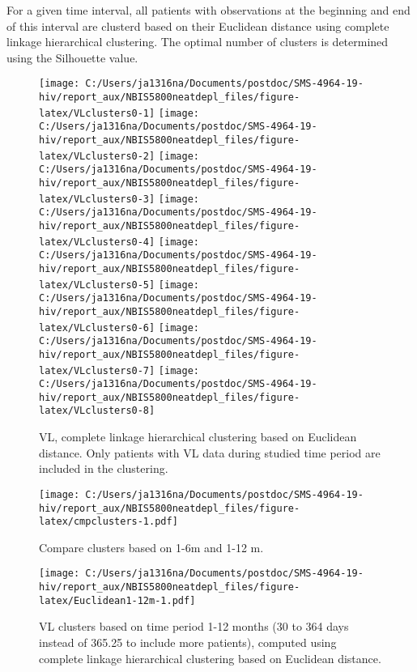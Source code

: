 \documentclass[
]{article}
\begin{document}
For a given time interval, all patients with observations at the beginning and end of this interval are clusterd based on their Euclidean distance using complete linkage hierarchical clustering. The optimal number of clusters is determined using the Silhouette value.

\begin{figure}
\texttt{[image: C:/Users/ja1316na/Documents/postdoc/SMS-4964-19-hiv/report\_aux/NBIS5800neatdepl\_files/figure-latex/VLclusters0-1]} \texttt{[image: C:/Users/ja1316na/Documents/postdoc/SMS-4964-19-hiv/report\_aux/NBIS5800neatdepl\_files/figure-latex/VLclusters0-2]} \texttt{[image: C:/Users/ja1316na/Documents/postdoc/SMS-4964-19-hiv/report\_aux/NBIS5800neatdepl\_files/figure-latex/VLclusters0-3]} \texttt{[image: C:/Users/ja1316na/Documents/postdoc/SMS-4964-19-hiv/report\_aux/NBIS5800neatdepl\_files/figure-latex/VLclusters0-4]} \texttt{[image: C:/Users/ja1316na/Documents/postdoc/SMS-4964-19-hiv/report\_aux/NBIS5800neatdepl\_files/figure-latex/VLclusters0-5]} \texttt{[image: C:/Users/ja1316na/Documents/postdoc/SMS-4964-19-hiv/report\_aux/NBIS5800neatdepl\_files/figure-latex/VLclusters0-6]} \texttt{[image: C:/Users/ja1316na/Documents/postdoc/SMS-4964-19-hiv/report\_aux/NBIS5800neatdepl\_files/figure-latex/VLclusters0-7]} \texttt{[image: C:/Users/ja1316na/Documents/postdoc/SMS-4964-19-hiv/report\_aux/NBIS5800neatdepl\_files/figure-latex/VLclusters0-8]} \caption{VL, complete linkage hierarchical clustering based on Euclidean distance. Only patients with VL data during studied time period are included in the clustering.}\label{fig:VLclusters0}
\end{figure}

\FloatBarrier

\begin{figure}
\centering
\texttt{[image: C:/Users/ja1316na/Documents/postdoc/SMS-4964-19-hiv/report\_aux/NBIS5800neatdepl\_files/figure-latex/cmpclusters-1.pdf]}
\caption{\label{fig:cmpclusters}Compare clusters based on 1-6m and 1-12 m.}
\end{figure}

\begin{figure}
\centering
\texttt{[image: C:/Users/ja1316na/Documents/postdoc/SMS-4964-19-hiv/report\_aux/NBIS5800neatdepl\_files/figure-latex/Euclidean1-12m-1.pdf]}
\caption{\label{fig:Euclidean1-12m}VL clusters based on time period 1-12 months (30 to 364 days instead of 365.25 to include more patients), computed using complete linkage hierarchical clustering based on Euclidean distance.}
\end{figure}
\end{document}
